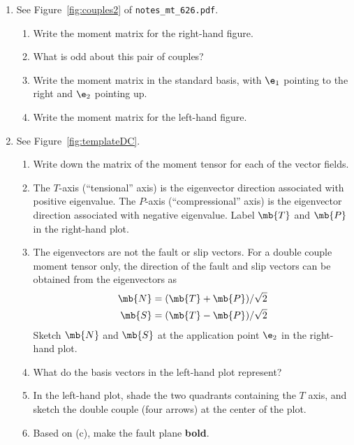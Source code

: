 \documentclass[11pt,titlepage,fleqn]{article}
\newcommand{\mtfile}{\texttt{notes\_mt\_626.pdf}}
\begin{document}
\begin{enumerate}
\begin{enumerate}
Draw the base of each vector at the tip of $\e_1$, $-\e_1$, $\e_2$, or $-\e_2$.

Here, draw all forces as unit vectors. 

\item Which entries of the matrix represent the classical description of the double couple?
(See ``Nomenclature confusion'' in \mtfile.)
\end{enumerate}


\item See Figure~\ref{fig:couples2} of \mtfile.
%
\begin{enumerate}
\item Write the moment matrix for the right-hand figure.
\item What is odd about this pair of couples?
\item Write the moment matrix in the standard basis, with $\e_1$ pointing to the right and $\e_2$ pointing up.
\item Write the moment matrix for the left-hand figure.
\end{enumerate}


\item See Figure~\ref{fig:templateDC}.
%
\begin{enumerate}
\item Write down the matrix of the moment tensor for each of the vector fields.

\item The $T$-axis (``tensional'' axis) is the eigenvector direction associated with positive eigenvalue. The $P$-axis (``compressional'' axis) is the eigenvector direction associated with negative eigenvalue. Label $\mb{T}$ and $\mb{P}$ in the right-hand plot.

\item The eigenvectors are not the fault or slip vectors. For a double couple moment tensor only, the direction of the fault and slip vectors can be obtained from the eigenvectors as 
%
\begin{eqnarray*}
\mb{N} = (\mb{T} + \mb{P})/\sqrt{2}
\\
\mb{S} = (\mb{T} - \mb{P})/\sqrt{2}
\end{eqnarray*}
%
Sketch $\mb{N}$ and $\mb{S}$ at the application point $\e_2$ in the right-hand plot.
\item What do the basis vectors in the left-hand plot represent?
\item In the left-hand plot, shade the two quadrants containing the $T$ axis, and sketch the double couple (four arrows) at the center of the plot.
\item Based on (c), make the fault plane {\bf bold}.
\end{enumerate}


\end{enumerate}
\end{document}
